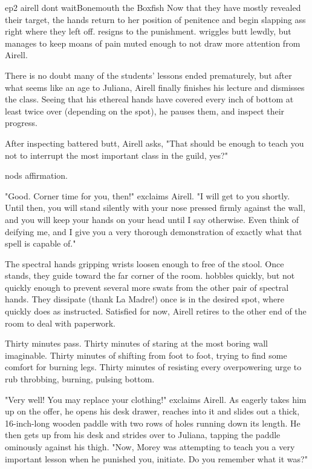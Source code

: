 \documentclass{book}
\begin{document}
\begin{childnode}{ep2 airell dont wait}{Bonemouth the Boxfish}
Now that they have mostly revealed their target, the hands return \name{} to her position of penitence and begin slapping \hisher{} ass right where they left off. \name{} resigns \himselfherself{} 
to the punishment. \HeShe{} wriggles \hisher{} butt lewdly, but manages to keep \hisher{} moans of pain muted enough to not draw more attention from Airell. 

There is no doubt many of the students' lessons ended prematurely, but after what seems like an age 
to Juliana, Airell finally finishes his lecture and dismisses the class. Seeing that his ethereal 
hands have covered 
every inch of \names{} bottom at least twice over (depending on the spot), he pauses them, and  inspect 
their progress. 

After inspecting \hisher{} battered butt, Airell asks, "That should be enough to teach you not to interrupt the most important class in the guild, yes?" 

\name{} nods \hisher{} affirmation. 

"Good. Corner time for you, then!" exclaims Airell. "I will get to you shortly. Until then, you will stand silently with your nose pressed firmly against the wall, and you will keep your hands on 
your head until I say otherwise. Even think of deifying me, and I give you a very thorough demonstration of exactly what that spell is capable of."

The spectral hands gripping \names{} wrists loosen enough to free \himher{} of the stool. Once \name{} stands, they guide \himher{} toward the far corner of the room. \name{} hobbles quickly, but 
not quickly enough to prevent several more swats from the other pair of spectral hands. They dissipate (thank La Madre!) once \name{} is in the desired spot, where \heshe{} quickly does as 
instructed. Satisfied for now, Airell retires to the other end of the room to deal with paperwork.

Thirty minutes pass. Thirty minutes of staring at the most boring wall imaginable. Thirty minutes of shifting from foot to foot, trying to find some comfort for \hisher{} burning legs. Thirty
minutes of resisting every overpowering urge to rub \hisher{} throbbing, burning, pulsing bottom. 

"Very well! You may replace your clothing!" exclaims Airell. As \name{} eagerly takes him up on the offer, he opens his desk drawer, reaches into it and slides out a thick, 16-inch-long wooden 
paddle with two rows of holes running down its length. He then gets up from his desk and strides over to Juliana, tapping the paddle ominously against his thigh. "Now, Morey was attempting to teach 
you a very important lesson when he punished you, initiate. Do you remember what it was?"


\end{childnode}
\end{document}
